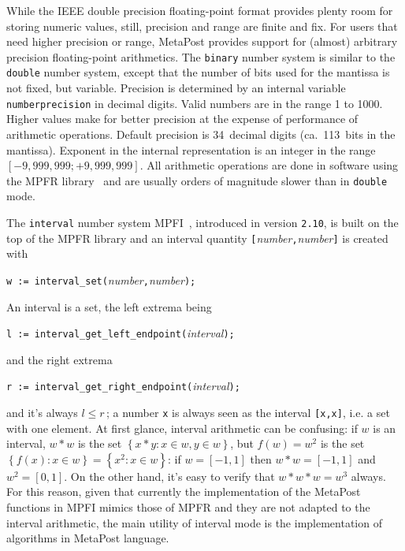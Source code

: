 While the IEEE double precision floating-point format provides plenty
room for storing numeric values, still, precision and range are finite
and fix.  For users that need higher precision or range, MetaPost
provides support for (almost) arbitrary precision floating-point
arithmetics.  The \texttt{binary} number
system is similar to the \texttt{double} number system, except that the
number of bits used for the mantissa is not fixed, but variable.
Precision is determined by an internal variable
\texttt{numberprecision}\label{Dnumberprecision}
in decimal digits.  Valid numbers are in the range 1 to 1000.  Higher
values make for better precision at the expense of performance of
arithmetic operations.  Default precision is 34~decimal digits
(ca.~113~bits in the mantissa).  Exponent in the internal representation
is an integer in the range $[-9,999,999; +9,999,999]$.  All arithmetic
operations are done in software using the MPFR library~\cite{lib:mpfr}
and are usually orders of magnitude slower than in \texttt{double} mode.

The \texttt{interval} number
system MPFI~\cite{lib:mpfi}, introduced in version \texttt{2.10}, is built on the top of the MPFR library
and an interval quantity \texttt{[}\textit{number}\texttt{,}\textit{number}\texttt{]} is created with
\begin{center}\label{Dintervalset}\texttt{w := interval\_set(}\textit{number}\texttt{,}\textit{number}\texttt{);}\end{center}
An interval is a set, the left extrema being
\begin{center}\label{Dintervalleft}\texttt{l := interval\_get\_left\_endpoint(}\textit{interval}\texttt{);}\end{center}
and  the right extrema 
\begin{center}\label{Dintervalright}\texttt{r := interval\_get\_right\_endpoint(}\textit{interval}\texttt{);}\end{center}
and it's always $l\leq r$\,; a number \texttt{x} is always seen as the interval \texttt{[x,x]}, i.e. a set with one element.
At first glance, interval arithmetic can be confusing: if $w$ is an interval,
$w*w$ is the set $\left\{ x*y: x\in w, y\in w\right\}$, but $f(w)=w^2$  is the set $\left\{f(x): x\in w\right\} = \left\{x^2: x\in w\right\}$:
if $w=[-1,1]$ then $w*w=[-1,1]$ and $w^2=[0,1]$. On the other hand, it's easy to verify that $w*w*w = w^3$ always. For this reason,
given that currently the
implementation of the MetaPost functions in MPFI mimics those of MPFR and they are not adapted to the interval arithmetic,
the main utility of interval mode is the implementation of algorithms in MetaPost language.





